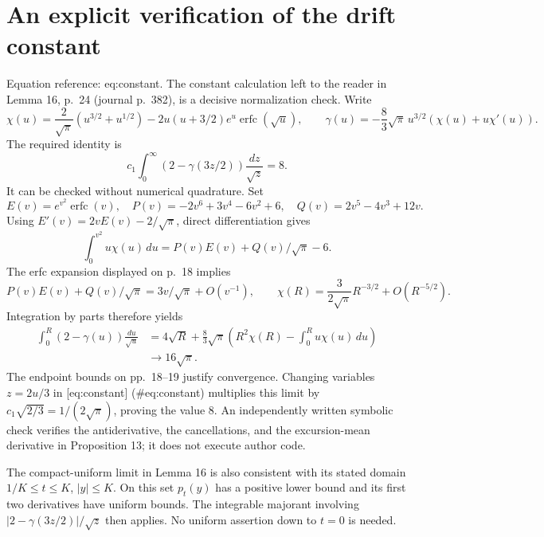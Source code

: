 \documentclass[10pt]{article}
\begin{document}
\section*{An explicit verification of the drift constant}
Equation reference: eq:constant. The constant calculation left to the reader in Lemma 16, p. 24 (journal p. 382), is a decisive normalization check. Write \[\chi(u)=\frac{2}{\sqrt\pi}(u^{3/2}+u^{1/2})
       -2u(u+3/2)e^u\operatorname{erfc}(\sqrt u),\qquad
 \gamma(u)=-\frac83\sqrt\pi\,u^{3/2}(\chi(u)+u\chi'(u)).\] The required identity is \[
 c_1\int_0^\infty
       \left(2-\gamma(3z/2)\right)\frac{dz}{\sqrt z}=8.\] It can be checked without numerical quadrature. Set \[E(v)=e^{v^2}\operatorname{erfc}(v),\quad
 P(v)=-2v^6+3v^4-6v^2+6,\quad
 Q(v)=2v^5-4v^3+12v .\] Using \(E'(v)=2vE(v)-2/\sqrt\pi\), direct differentiation gives \[\int_0^{v^2}u\chi(u)\,du
       =P(v)E(v)+Q(v)/\sqrt\pi-6.\] The erfc expansion displayed on p. 18 implies \[P(v)E(v)+Q(v)/\sqrt\pi=3v/\sqrt\pi+O(v^{-1}),\qquad
 \chi(R)=\frac{3}{2\sqrt\pi}R^{-3/2}+O(R^{-5/2}).\] Integration by parts therefore yields \[\begin{aligned}
 \int_0^R(2-\gamma(u))\frac{du}{\sqrt u}
 &=4\sqrt R+\frac83\sqrt\pi
       \left(R^2\chi(R)-\int_0^R u\chi(u)\,du\right)\\
 &\longrightarrow16\sqrt\pi .\end{aligned}\] The endpoint bounds on pp. 18–19 justify convergence. Changing variables \(z=2u/3\) in [eq:constant] (\#eq:constant) multiplies this limit by \(c_1\sqrt{2/3}=1/(2\sqrt\pi)\), proving the value \(8\). An independently written symbolic check verifies the antiderivative, the cancellations, and the excursion-mean derivative in Proposition 13; it does not execute author code.\par
The compact-uniform limit in Lemma 16 is also consistent with its stated domain \(1/K\leq t\leq K\), \(|y|\leq K\). On this set \(p_t(y)\) has a positive lower bound and its first two derivatives have uniform bounds. The integrable majorant involving \(|2-\gamma(3z/2)|/\sqrt z\) then applies. No uniform assertion down to \(t=0\) is needed.\par
\end{document}
